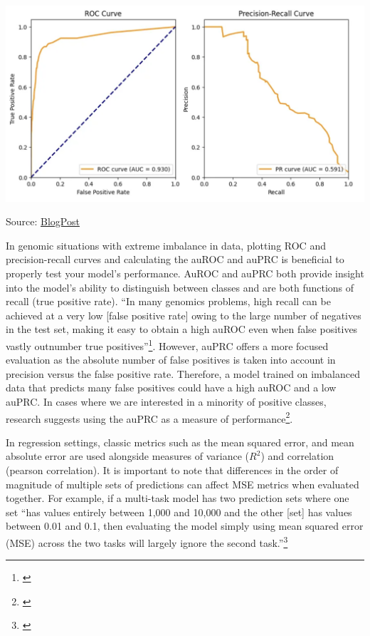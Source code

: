 \documentclass[
]{book}
\begin{document}
\includegraphics{images/auroc_auprc.png}

Source: \href{https://juandelacalle.medium.com/how-and-why-i-switched-from-the-roc-curve-to-the-precision-recall-curve-to-analyze-my-imbalanced-6171da91c6b8}{BlogPost}

In genomic situations with extreme imbalance in data, plotting ROC and precision-recall curves and calculating the auROC and auPRC is beneficial to properly test your model's performance. AuROC and auPRC both provide insight into the model's ability to distinguish between classes and are both functions of recall (true positive rate). ``In many genomics problems, high recall can be achieved at a very low {[}false positive rate{]} owing to the large number of negatives in the test set, making it easy to obtain a high auROC even when false positives vastly outnumber true positives''\footnote{\citet{whalen2022}}. However, auPRC offers a more focused evaluation as the absolute number of false positives is taken into account in precision versus the false positive rate. Therefore, a model trained on imbalanced data that predicts many false positives could have a high auROC and a low auPRC. In cases where we are interested in a minority of positive classes, research suggests using the auPRC as a measure of performance\footnote{\citet{whalen2022}}.

In regression settings, classic metrics such as the mean squared error, and mean absolute error are used alongside measures of variance (\(R^2\)) and correlation (pearson correlation). It is important to note that differences in the order of magnitude of multiple sets of predictions can affect MSE metrics when evaluated together. For example, if a multi-task model has two prediction sets where one set ``has values entirely between 1,000 and 10,000 and the other {[}set{]} has values between 0.01 and 0.1, then evaluating the model simply using mean squared error (MSE) across the two tasks will largely ignore the second task.''\footnote{\citet{whalen2022}}
\end{document}
